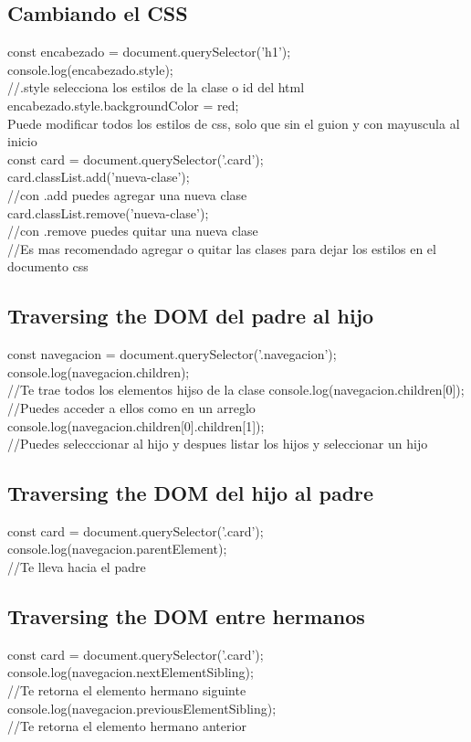 \documentclass[10pt,a4paper]{article}
\begin{document}
\newpage
\subsection{Cambiando el CSS}
const encabezado = document.querySelector('h1'); \\
console.log(encabezado.style); \\
//.style selecciona los estilos de la clase o id del html \\
encabezado.style.backgroundColor = red;\\
Puede modificar todos los estilos de css, solo que sin el guion y con mayuscula al inicio \\
const card = document.querySelector('.card'); \\
card.classList.add('nueva-clase'); \\
//con .add puedes agregar una nueva clase \\ 
card.classList.remove('nueva-clase'); \\
//con .remove puedes quitar una nueva clase \\ 
//Es mas recomendado agregar o quitar las clases para dejar los estilos en el documento css \\
\subsection{Traversing the DOM del padre al hijo}
const navegacion = document.querySelector('.navegacion');
console.log(navegacion.children);\\
//Te trae todos los elementos hijso de la clase 
console.log(navegacion.children[0]);\\
//Puedes acceder a ellos como en un arreglo \\
console.log(navegacion.children[0].children[1]);\\
//Puedes selecccionar al hijo y despues listar los hijos y seleccionar un hijo\\
\subsection{Traversing the DOM del hijo al padre}
const card = document.querySelector('.card');
console.log(navegacion.parentElement);\\
//Te lleva hacia el padre \\

\subsection{Traversing the DOM entre hermanos}
const card = document.querySelector('.card');
console.log(navegacion.nextElementSibling);\\
//Te retorna el elemento hermano siguinte\\
console.log(navegacion.previousElementSibling);\\
//Te retorna el elemento hermano anterior\\
\end{document}
